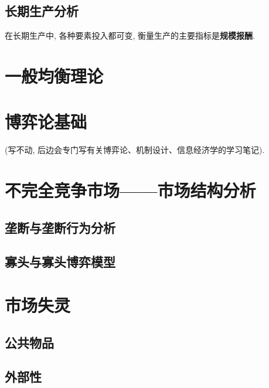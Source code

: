 \documentclass[lang=cn,10pt]{elegantbook}
\begin{document}
\section{长期生产分析}
在长期生产中, 各种要素投入都可变, 衡量生产的主要指标是\textbf{规模报酬}.
\chapter{一般均衡理论}

\chapter{博弈论基础}
(写不动, 后边会专门写有关博弈论、机制设计、信息经济学的学习笔记).
\chapter{不完全竞争市场——市场结构分析}
\section{垄断与垄断行为分析}
\section{寡头与寡头博弈模型}
\chapter{市场失灵}
\section{公共物品}
\section{外部性}

\end{document}
